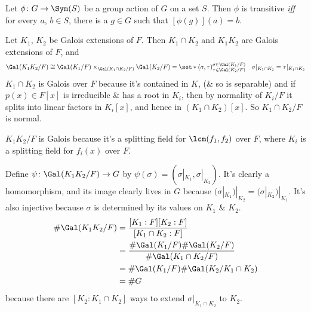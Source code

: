  Let $\phi\colon G\to\Sym(S)$ be a group action of $G$ on a set $S$.  Then $\phi$ is transitive \emph{iff} for every $a$, $b\in S$, there is a $g\in G$ such that $[\phi(g)](a)=b$.

\thm Let $K_1$, $K_2$ be Galois extensions of $F$.  Then $K_1\cap K_2$ and $K_1K_2$ are Galois extensions of $F$, and
\[ \Gal(K_1K_2/F) \cong \Gal(K_1/F) \times_{\Gal(K_1\cap K_2/F)} \Gal(K_2/F) = \set*{(\sigma,\tau)}{\substack{\sigma\in\Gal(K_1/F)\\\tau\in\Gal(K_2/F)}\quad\sigma|_{K_1\cap K_2}=\tau|_{K_1\cap K_2}} \]
\pf $K_1\cap K_2$ is Galois over $F$ because it's contained in $K$, (\& so is separable) and if $p(x)\in F[x]$ is irreducible \& has a root in $K_i$, then by normality of $K_i/F$ it splits into linear factors in $K_i[x]$, and hence in $(K_1\cap K_2)[x]$.  So $K_1\cap K_2/F$ is normal.

$K_1K_2/F$ is Galois because it's a splitting field for $\lcm(f_1,f_2)$ over $F$, where $K_i$ is a splitting field for $f_i(x)$ over $F$.

Define $\psi\colon\Gal(K_1K_2/F)\to G$ by $\psi(\sigma)=(\sigma|_{K_1},\sigma|_{K_2})$.  It's clearly a homomorphism, and its image clearly lives in $G$ because $(\sigma|_{K_1})|_{K_2}=(\sigma|_{K_2})|_{K_1}$.  It's also injective because $\sigma$ is determined by its values on $K_1$ \& $K_2$.
\begin{align*}
\#\Gal(K_1K_2/F) &= \frac{[K_1:F][K_2:F]}{[K_1\cap K_2:F]} \\
&= \frac{\#\Gal(K_1/F)\#\Gal(K_2/F)}{\#\Gal(K_1\cap K_2/F)} \\
&= \#\Gal(K_1/F)\#\Gal(K_2/K_1\cap K_2) \\
&= \# G
\end{align*}
because there are $[K_2:K_1\cap K_2]$ ways to extend $\sigma|_{K_1\cap K_2}$ to $K_2$.

